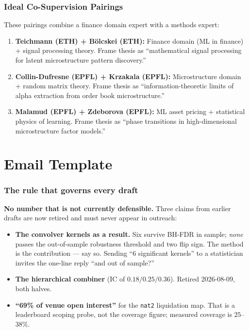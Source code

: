 \documentclass[11pt,a4paper]{article}
\begin{document}
\section{Ideal Co-Supervision Pairings}

These pairings combine a finance domain expert with a methods expert:

\begin{enumerate}
  \item \textbf{Teichmann (ETH) + B\"olcskei (ETH):} Finance domain (ML in finance) + signal processing theory. Frame thesis as ``mathematical signal processing for latent microstructure pattern discovery.''
  \item \textbf{Collin-Dufresne (EPFL) + Krzakala (EPFL):} Microstructure domain + random matrix theory. Frame thesis as ``information-theoretic limits of alpha extraction from order book microstructure.''
  \item \textbf{Malamud (EPFL) + Zdeborova (EPFL):} ML asset pricing + statistical physics of learning. Frame thesis as ``phase transitions in high-dimensional microstructure factor models.''
\end{enumerate}

\newpage

\part{Email Template}

\section{The rule that governs every draft}

\textbf{No number that is not currently defensible.} Three claims from earlier drafts are now
retired and must never appear in outreach:

\begin{itemize}
  \item \textbf{The convolver kernels as a result.} Six survive BH-FDR in sample; \emph{none} passes
        the out-of-sample robustness threshold and two flip sign. The method is the contribution ---
        say so. Sending ``6 significant kernels'' to a statistician invites the one-line reply
        ``and out of sample?''
  \item \textbf{The hierarchical combiner} ($\text{IC}$ of $0.18/0.25/0.36$). Retired
        2026-08-09, both halves.
  \item \textbf{``69\% of venue open interest''} for the \texttt{nat2} liquidation map. That is a
        leaderboard scoping probe, not the coverage figure; measured coverage is $25$--$38\%$.
\end{itemize}
\end{document}
